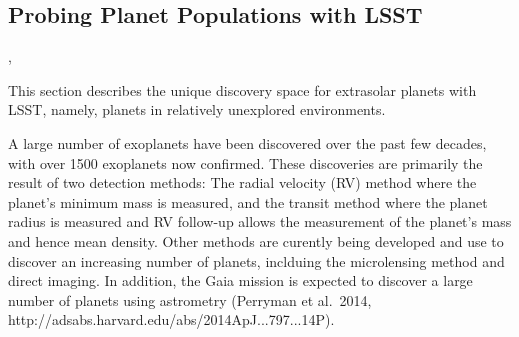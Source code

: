 %
%

\subsection{Probing Planet Populations with LSST}
\def\secname{planets}\label{sec:\secname}

,

This section describes the unique discovery space for
extrasolar planets with LSST, namely,
planets in relatively unexplored environments.


A large number of exoplanets have been discovered over the past few
decades, with over 1500 exoplanets now confirmed. These discoveries are
primarily the result of two detection methods: The radial velocity (RV)
method where the planet's minimum mass is measured, and the transit
method where the planet radius is measured and RV follow-up allows the
measurement of the planet's mass and hence mean density. Other methods
are curently being developed and use to discover an increasing number of
planets, inclduing the microlensing method and direct imaging. In
addition, the Gaia mission is expected to discover a large number of
planets using astrometry (Perryman et al.~2014,
http://adsabs.harvard.edu/abs/2014ApJ...797...14P).

